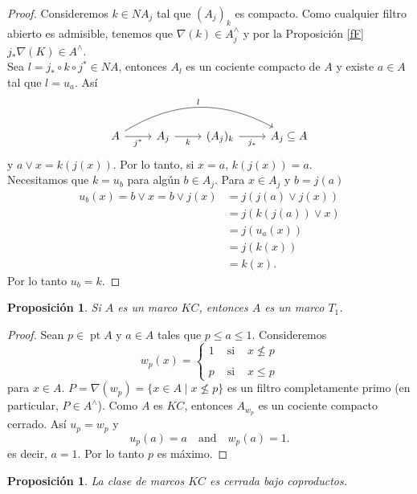 \documentclass[11pt]{amsart}
\DeclareMathOperator{\pt}{pt}
\theoremstyle{plain}
\newtheorem{prop}[thm]{Proposición}
\theoremstyle{definition}
\begin{document}
\begin{proof} %
Consideremos $k\in NA_j$ tal que $(A_j)_k$ es compacto. 
Como cualquier filtro abierto es admisible, tenemos que $\nabla(k)\in A_j^\wedge$ 
y por la Proposición \ref{fF} $j_*\nabla(K)\in A^\wedge$.\\

Sea $l=j_*\circ  k\circ j^*\in NA$, entonces $A_l$ es un cociente compacto de $A$ y existe $a\in A$ tal que $l=u_a$. Así
\[
\begin{tikzcd}
	A \arrow[r, "j^*"'] \arrow[rrr, "l", bend left] & A_j \arrow[r, "k"'] & (A_j)_k \arrow[r, "j_*"'] & A_j\subseteq A
	\end{tikzcd}\]
y $a\vee x=k(j(x))$. Por lo tanto, si $x=a$, $k(j(x))=a$.\\

Necesitamos que $k=u_b$ para algún $b\in A_j$. Para $x\in A_j$ y $b=j(a)$
\[
\begin{split}
u_b(x)= b\vee x= b\vee j(x)& =j(j(a)\vee j(x))\\
& =j(k(j(a))\vee x)\\
& =j(u_a(x))\\
& =j(k(x))\\	
&=k(x).
\end{split}
\]
Por lo tanto $u_b=k$.
\end{proof}

\begin{prop}\label{KCT1}
Si $A$ es un marco $KC$, entonces $A$ es un marco $T_1$.
\end{prop}

\begin{proof}
Sean $p\in \pt A$ y $a\in A$ tales que $p\leq a\leq 1$. Consideremos 
\[
w_p(x)=\left\{\begin{array}{lcc}
1 & \mbox{ si } & x\nleq p\\
\\
p & \mbox{ si } & x\leq p
\end{array}\right.
\]
para $x\in A$. $P=\nabla(w_p)=\{x\in A\mid x\nleq p\}$ es un filtro completamente primo (en particular, $P\in A^\wedge$). Como $A$ es $KC$, entonces $A_{w_p}$ es un cociente compacto cerrado. Así $u_p=w_p$ y
\[
u_p(a)=a\quad \mbox{and}\quad w_p(a)=1.
\]
es decir, $a=1$. Por lo tanto $p$ es máximo. 
\end{proof}

\begin{prop}\label{coprodKC}
La clase de marcos $KC$ es cerrada bajo coproductos. 
\end{prop}
\end{document}
